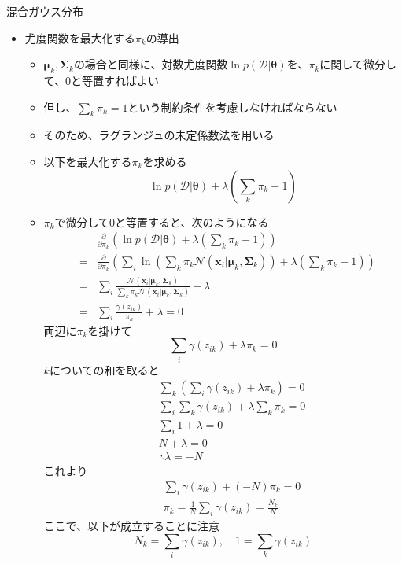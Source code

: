 \documentclass[dvipdfmx,notheorems,t]{beamer}
\begin{document}
\begin{frame}{混合ガウス分布}

\begin{itemize}
	\item 尤度関数を最大化する$\pi_k$の導出
	\begin{itemize}
		\item $\bm{\mu}_k, \bm{\Sigma}_k$の場合と同様に、対数尤度関数$\ln p(\mathcal{D} | \bm{\theta})$を、$\pi_k$に関して微分して、$0$と等置すればよい
		\item 但し、\color{red}$\sum_k \pi_k = 1$\normalcolor という制約条件を考慮しなければならない
		\item そのため、\alert{ラグランジュの未定係数法}を用いる
		\newline
		\item 以下を最大化する$\pi_k$を求める
		\begin{equation}
			\ln p(\mathcal{D} | \bm{\theta}) + \lambda \left( \sum_k \pi_k - 1 \right)
		\end{equation}
		\item $\pi_k$で微分して$0$と等置すると、次のようになる
		\begin{eqnarray}
			&& \frac{\partial}{\partial \pi_k} \left( \ln p(\mathcal{D} | \bm{\theta}) + \lambda \left( \sum_k \pi_k - 1 \right) \right) \nonumber \\
			&=& \frac{\partial}{\partial \pi_k} \left( \sum_i \ln \left( \sum_k \pi_k \mathcal{N}(\bm{x}_i | \bm{\mu}_k, \bm{\Sigma}_k) \right) + \lambda \left( \sum_k \pi_k - 1 \right) \right) \nonumber \\
			&=& \sum_i \frac{\mathcal{N}(\bm{x}_i | \bm{\mu}_k, \bm{\Sigma}_k)}{\sum_k \pi_k \mathcal{N}(\bm{x}_i | \bm{\mu}_k, \bm{\Sigma}_k)} + \lambda \\
			&=& \sum_i \frac{\gamma(z_{ik})}{\pi_k} + \lambda = 0
		\end{eqnarray}
		両辺に$\pi_k$を掛けて
		\begin{equation}
			\sum_i \gamma(z_{ik}) + \lambda \pi_k = 0
		\end{equation}
		$k$についての和を取ると
		\begin{eqnarray}
			&& \sum_k \left( \sum_i \gamma(z_{ik}) + \lambda \pi_k \right) = 0 \\
			&& \sum_i \sum_k \gamma(z_{ik}) + \lambda \sum_k \pi_k = 0 \\
			&& \sum_i 1 + \lambda = 0 \\
			&& N + \lambda = 0 \\
			&& \therefore \lambda = -N
		\end{eqnarray}
		これより
		\begin{eqnarray}
			&& \sum_i \gamma(z_{ik}) + (-N) \pi_k = 0 \\
			&& \pi_k = \frac{1}{N} \sum_i \gamma(z_{ik}) = \frac{N_k}{N}
		\end{eqnarray}
		ここで、以下が成立することに注意
		\begin{equation}
			N_k = \sum_i \gamma(z_{ik}), \quad 1 = \sum_k \gamma(z_{ik}) \nonumber
		\end{equation}
		

\end{itemize}
\end{itemize}
\end{frame}
\end{document}
